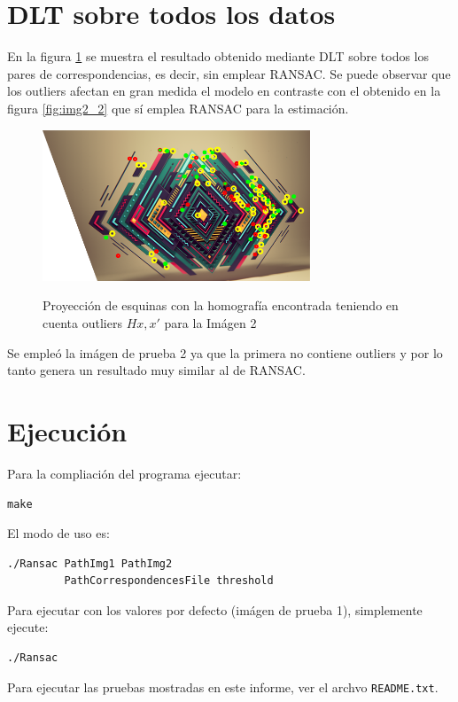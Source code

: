 \documentclass{IEEEtran}
\begin{document}
\section{DLT sobre todos los datos}

En la figura \ref{fig:DLT1} se muestra el resultado obtenido mediante
DLT sobre todos los pares de correspondencias, es decir, sin emplear RANSAC.
Se puede observar que los outliers afectan en gran medida el modelo en contraste
con el obtenido en la figura \ref{fig:img2_2} que sí emplea RANSAC para la
estimación.

\begin{figure}[H]
\caption{Proyección de esquinas con la homografía encontrada teniendo
en cuenta outliers $Hx, x'$ para la Imágen 2}
\centering
\includegraphics[width=8cm,natwidth=600,natheight=450]{figs/DLT1.png}
\label{fig:DLT1}
\end{figure}


Se empleó la imágen de prueba 2 ya que la primera no contiene outliers y por
lo tanto genera un resultado muy similar al de RANSAC.

\section{Ejecución}
Para la compliación del programa ejecutar:
\begin{verbatim}
make
\end{verbatim}

El modo de uso es:
\begin{verbatim}
./Ransac PathImg1 PathImg2 
         PathCorrespondencesFile threshold
\end{verbatim}

Para ejecutar con los valores por defecto (imágen de prueba 1), 
simplemente ejecute:
\begin{verbatim}
./Ransac
\end{verbatim}

Para ejecutar las pruebas mostradas en este informe, 
ver el archvo \verb+README.txt+.
\end{document}
